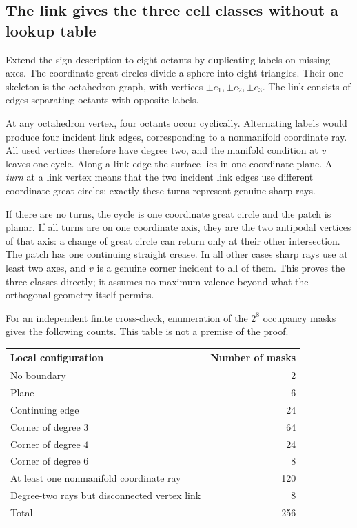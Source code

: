 \documentclass[11pt]{article}
\theoremstyle{definition}
\theoremstyle{remark}
\begin{document}
\subsection{The link gives the three cell classes without a lookup table}

Extend the sign description to eight octants by duplicating labels on
missing axes. The coordinate great circles divide a sphere into eight
triangles. Their one-skeleton is the octahedron graph, with vertices
$\pm e_1,\pm e_2,\pm e_3$. The link consists of edges separating octants
with opposite labels.

At any octahedron vertex, four octants occur cyclically. Alternating
labels would produce four incident link edges, corresponding to a
nonmanifold coordinate ray. All used vertices therefore have degree
two, and the manifold condition at $v$ leaves one cycle. Along a link
edge the surface lies in one coordinate plane. A \emph{turn} at a link
vertex means that the two incident link edges use different coordinate
great circles; exactly these turns represent genuine sharp rays.

If there are no turns, the cycle is one coordinate great circle and
the patch is planar. If all turns are on one coordinate axis, they are
the two antipodal vertices of that axis: a change of great circle can
return only at their other intersection. The patch has one continuing
straight crease. In all other cases sharp rays use at least two axes,
and $v$ is a genuine corner incident to all of them. This proves the
three classes directly; it assumes no maximum valence beyond what the
orthogonal geometry itself permits.

For an independent finite cross-check, enumeration of the $2^8$ occupancy
masks gives the following counts. This table is not a premise of the proof.
\begin{center}
\begin{tabular}{lr}
\toprule
Local configuration & Number of masks\\
\midrule
No boundary & 2\\
Plane & 6\\
Continuing edge & 24\\
Corner of degree $3$ & 64\\
Corner of degree $4$ & 24\\
Corner of degree $6$ & 8\\
At least one nonmanifold coordinate ray & 120\\
Degree-two rays but disconnected vertex link & 8\\
\midrule
Total & 256\\
\bottomrule
\end{tabular}
\end{center}
\end{document}
